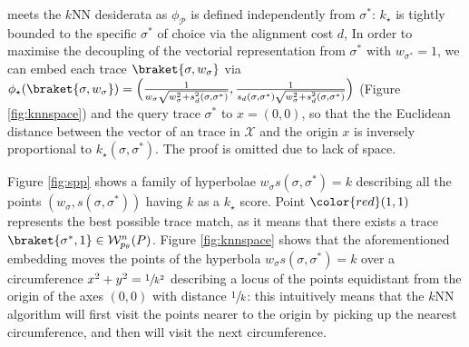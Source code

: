  meets the $k$NN desiderata as $\phi_{\mathcal{P}}$ is defined independently from $\sigma^*$:  $k_\star$  is tightly bounded to the specific $\sigma^*$ of choice via the alignment cost $d$,  In order to maximise the decoupling of the vectorial representation from $\sigma^*$ with $w_{\sigma^*}=1$,
 we can embed each \unravelled trace $\braket{\sigma,w_\sigma}$ via $\phi_\star(\braket{\sigma,w_\sigma})=\Big(\frac{1}{w_\sigma\sqrt{w_\sigma^2+s_d^2(\sigma,\sigma^*)}},\frac{1}{s_d(\sigma,\sigma^*)\sqrt{w_\sigma^2+s_d^2(\sigma,\sigma^*)}}\Big)$ (Figure \ref{fig:knnspace}) and the query trace $\sigma^*$ to $x=(0,0)$, so that the the Euclidean distance between the vector of an \unravelled trace in $\mathcal{X}$ and the origin $x$ is  inversely proportional to $k_\star(\sigma,\sigma^*)$. The proof is omitted due to lack of space. 

\begin{example}
	Figure \ref{fig:spp} shows a family of hyperbolae $w_\sigma s(\sigma,\sigma^*)=k$ describing all the points $(w_\sigma, s(\sigma,\sigma^*))$ having $k$ as a $k_\star$ score. Point $\color{red}(1,1)$ represents the best possible trace match, as it means that there exists a trace $\braket{\sigma^*,1}\in\mathcal{W}_{p_\theta}^n(P)$.
		Figure \ref{fig:knnspace} shows that the aforementioned embedding moves the points of the hyperbola $w_\sigma s(\sigma,\sigma^*)=k$ over a circumference $x^2+y^2=\sfrac{1}{k^2}$ describing a locus of the points equidistant from the origin of the axes $(0,0)$ with distance $\sfrac{1}{k}$: this intuitively means that the $k$NN algorithm will first visit the points nearer to the origin by picking up the nearest circumference, and then will visit the next circumference.
\end{example}


